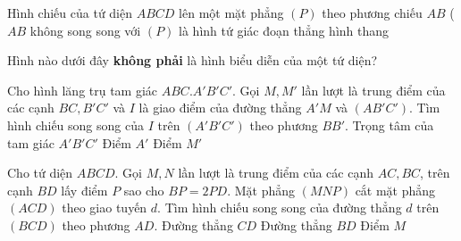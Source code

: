 \begin{ex}%
	Hình chiếu của tứ diện $ABCD$ lên một mặt phẳng $(P)$ theo phương chiếu $AB$ ($AB$ không song song với $(P)$ là
	{hình tứ giác}
	{đoạn thẳng}
	{hình thang}
\end{ex}

\begin{ex}%
	Hình nào dưới đây \textbf{không phải} là hình biểu diễn của một tứ diện?
	\def\dotEX{}
\end{ex}



\begin{ex}%
	Cho hình lăng trụ tam giác $ABC.A'B'C'$. Gọi $M, M'$ lần lượt là trung điểm của các cạnh $BC, B'C'$ và $I$ là giao điểm của đường thẳng $A'M$ và $(AB'C')$. Tìm hình chiếu song song của $I$ trên $(A'B'C')$ theo phương $BB'$.
	{Trọng tâm của tam giác $A'B'C'$}
	{Điểm $A'$}
	{Điểm $M'$}
\end{ex}

\begin{ex}%
	Cho tứ diện $ABCD$. Gọi $M, N$ lần lượt là trung điểm của các cạnh $AC, BC$, trên cạnh $BD$ lấy điểm $P$ sao cho $BP=2PD$. Mặt phẳng $(MNP)$ cắt mặt phẳng $(ACD)$ theo giao tuyến $d$. Tìm hình chiếu song song của đường thẳng $d$ trên $(BCD)$ theo phương $AD$.
	{\True Đường thẳng $CD$}
	{Đường thẳng $BD$}
	{Điểm $M$}
\end{ex}

